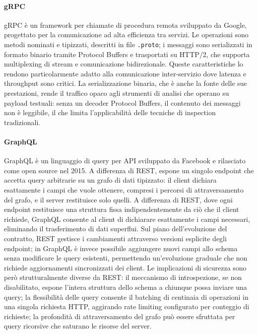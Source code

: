 \paragraph{gRPC}
\gls{gRPC} è un framework per chiamate di procedura remota sviluppato da Google, progettato per la comunicazione ad alta efficienza tra servizi. Le operazioni sono metodi nominati e tipizzati, descritti in file \texttt{.proto}; i messaggi sono serializzati in formato binario tramite Protocol Buffers e trasportati su \gls{HTTP}/2, che supporta multiplexing di stream e comunicazione bidirezionale. Queste caratteristiche lo rendono particolarmente adatto alla comunicazione inter-servizio dove latenza e throughput sono critici. La serializzazione binaria, che è anche la fonte delle sue prestazioni, rende il traffico opaco agli strumenti di analisi che operano su payload testuali: senza un decoder Protocol Buffers, il contenuto dei messaggi non è leggibile, il che limita l'applicabilità delle tecniche di inspection tradizionali.

\paragraph{GraphQL}
\gls{GraphQL} è un linguaggio di query per \gls{API} sviluppato da Facebook e rilasciato come open source nel 2015. A differenza di REST, espone un singolo endpoint che accetta query arbitrarie su un grafo di dati tipizzato: il client dichiara esattamente i campi che vuole ottenere, compresi i percorsi di attraversamento del grafo, e il server restituisce solo quelli. A differenza di REST, dove ogni endpoint restituisce una struttura fissa indipendentemente da ciò che il client richiede, GraphQL consente al client di dichiarare esattamente i campi necessari, eliminando il trasferimento di dati superflui. Sul piano dell'evoluzione del contratto, REST gestisce i cambiamenti attraverso versioni esplicite degli endpoint; in GraphQL è invece possibile aggiungere nuovi campi allo schema senza modificare le query esistenti, permettendo un'evoluzione graduale che non richiede aggiornamenti sincronizzati dei client. Le implicazioni di sicurezza sono però strutturalmente diverse da REST: il meccanismo di introspezione, se non disabilitato, espone l'intera struttura dello schema a chiunque possa inviare una query; la flessibilità delle query consente il batching di centinaia di operazioni in una singola richiesta \gls{HTTP}, aggirando rate limiting configurato per conteggio di richieste; la profondità di attraversamento del grafo può essere sfruttata per query ricorsive che saturano le risorse del server.

